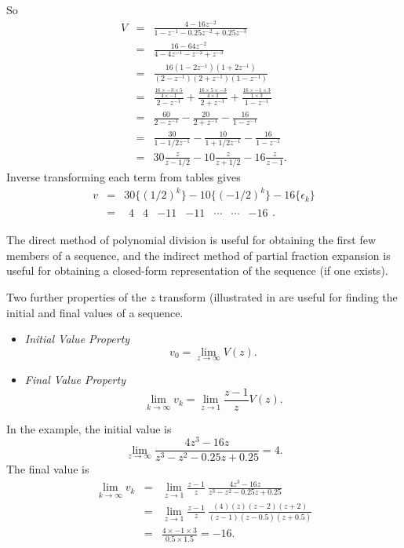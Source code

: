 So \begin{eqnarray*}
 V & =&  \frac{4-16z^{-2}}{1-z^{-1}-0.25 z^{-2} +
0.25 z^{-3}}\\ &=& \frac{16-64z^{-2}}{4-4z^{-1}-z^{-2} + z^{-3}}\\
&=&
\frac{16(1-2z^{-1})(1+2z^{-1})}{(2-z^{-1})(2+z^{-1})(1-z^{-1})}\\
&=& \frac{\frac{16\times -3\times 5}{4\times -1}}{2-z^{-1}} +
\frac{\frac{16\times 5\times -3}{4\times 3}}{2+z^{-1}} +
\frac{\frac{16\times -1 \times 3}{1\times 3}}{1-z^{-1}}
\\ &=&\frac{60}{2-z^{-1}} -
\frac{20}{2+z^{-1}} - \frac{16}{1-z^{-1}}
\\&=&\frac{30}{1-{1/2}z^{-1}} -
\frac{10}{1+{1/2}z^{-1}} - \frac{16}{1-z^{-1}}
\\
&=& 30\frac{z}{z-{1/2}} - 10\frac{z}{z+{1/2}} - 16\frac{z}{z-1}.
\end{eqnarray*}
Inverse transforming each term from tables gives
\begin{eqnarray*}v&=&30\{(1/2)^k\}-10\{(-1/2)^k\} -16 \{\epsilon_k\}\\
&=& \begin{array}{ccccccc}
  4 & 4 & -11 & -11 & \cdots & \cdots & -16
\end{array}.
\end{eqnarray*}

The direct method of polynomial division is useful for obtaining
the first few members of a sequence, and the indirect method of
partial fraction expansion is useful for obtaining a closed-form
representation of the sequence (if one exists).

Two further properties of the $z$ transform (illustrated in
 are useful for finding the initial and final
values of a sequence.
\begin{slide}\label{slide:l8s10}
  \begin{itemize}
  \item \emph{Initial Value Property} \[v_0 = \lim_{z\rightarrow
  \infty}V(z).\]
  \item \emph{Final Value Property} \[\lim_{k\rightarrow \infty}v_k = \lim_{z\rightarrow
      1}\frac{z-1}{z}V(z).\]
  \end{itemize}
\end{slide}

In the example, the initial value is \[\lim_{z\rightarrow
  \infty}\frac{4z^3-16z}{z^3-z^2-0.25z+0.25} = 4.\] The final value is
\begin{eqnarray*}
  \lim_{k\rightarrow \infty}v_k &=& \lim_{z\rightarrow
      1}\frac{z-1}{z}\ \frac{4z^3-16z}{z^3-z^2-0.25z+0.25}\\
 &=& \lim_{z\rightarrow
      1}\frac{z-1}{z}\ \frac{(4)(z)(z-2)(z+2)}{(z-1)(z-0.5)(z+0.5)}\\
&=& \frac{4\times -1 \times 3}{0.5\times 1.5} = -16.
\end{eqnarray*}
\endinput

